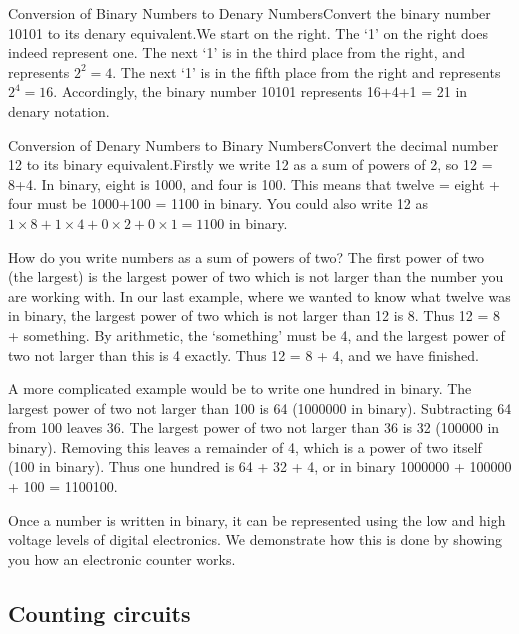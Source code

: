 \begin{wex}{Conversion of Binary Numbers to Denary Numbers}{Convert the binary number 10101 to its denary equivalent.}{We start on the right.  The `1' on the right does indeed represent one.  The next `1' is in the third place from the right, and represents $2^2 = 4$.  The next `1' is in the fifth place from the right and represents $2^4 = 16$.  Accordingly, the binary number 10101 represents 16+4+1 = 21 in denary notation.}
\end{wex}


\begin{wex}{Conversion of Denary Numbers to Binary Numbers}{Convert the decimal number 12 to its binary equivalent.}{Firstly we write 12 as a sum of powers of 2, so 12 = 8+4.  In binary, eight is 1000, and four is 100.  This means that twelve = eight + four must be 1000+100 = 1100 in binary.  You could also write 12 as $1 \times 8 + 1 \times 4 + 0 \times 2 + 0 \times 1 = 1100$ in binary.}
\end{wex}

\begin{IFact}{How do you write numbers as a sum of powers of two?  The first power of two (the largest) is the largest power of two which is not larger than the number you are working with.  In our last example, where we wanted to know what twelve was in binary, the largest power of two which is not larger than 12 is 8.  Thus 12 = 8 + something.  By arithmetic, the `something' must be 4, and the largest power of two not larger than this is 4 exactly.  Thus 12 = 8 + 4, and we have finished.

A more complicated example would be to write one hundred in binary.  The largest power of two not larger than 100 is 64 (1000000 in binary).  Subtracting 64 from 100 leaves 36.  The largest power of two not larger than 36 is 32 (100000 in binary).  Removing this leaves a remainder of 4, which is a power of two itself (100 in binary).  Thus one hundred is 64 + 32 + 4, or in binary  1000000 + 100000 + 100 = 1100100.} \end{IFact}

Once a number is written in binary, it can be represented using the low and high voltage levels of digital electronics.  We demonstrate how this is done by showing you how an electronic counter works.

\subsection{Counting circuits}

